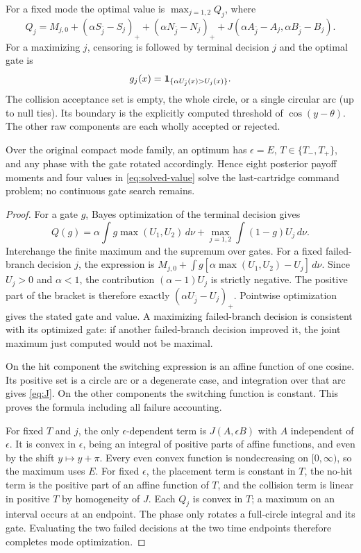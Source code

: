 \begin{theorem}\label{thm:arc}
For a fixed mode the optimal value is $\max_{j=1,2}Q_j$, where
\begin{equation}
 Q_j=M_{j,0}+(\alpha S_{\bar j}-S_j)_+
 +(\alpha N_{\bar j}-N_j)_+
 +J(\alpha A_{\bar j}-A_j,\alpha B_{\bar j}-B_j).
 \label{eq:solved-value}
\end{equation}
For a maximizing $j$, censoring is followed by terminal decision $j$ and the optimal gate is
\begin{equation}
 g_j(x)=\mathbf1_{\{\alpha U_{\bar j}(x)>U_j(x)\}}.
 \label{eq:solved-gate}
\end{equation}
The collision acceptance set is empty, the whole circle, or a single circular arc (up to null ties). Its boundary is the explicitly computed threshold of $\cos(y-\theta)$. The other raw components are each wholly accepted or rejected.

Over the original compact mode family, an optimum has $\epsilon=E$, $T\in\{T_-,T_+\}$, and any phase with the gate rotated accordingly. Hence eight posterior payoff moments and four values in \eqref{eq:solved-value} solve the last-cartridge command problem; no continuous gate search remains.
\end{theorem}
\begin{proof}
For a gate $g$, Bayes optimization of the terminal decision gives
\[
 Q(g)=\alpha\int g\max(U_1,U_2)\,d\nu
       +\max_{j=1,2}\int(1-g)U_j\,d\nu.
\]
Interchange the finite maximum and the supremum over gates. For a fixed failed-branch decision $j$, the expression is
$M_{j,0}+\int g[\alpha\max(U_1,U_2)-U_j]\,d\nu$.
Since $U_j>0$ and $\alpha<1$, the contribution $(\alpha-1)U_j$ is strictly negative. The positive part of the bracket is therefore exactly $(\alpha U_{\bar j}-U_j)_+$. Pointwise optimization gives the stated gate and value. A maximizing failed-branch decision is consistent with its optimized gate: if another failed-branch decision improved it, the joint maximum just computed would not be maximal.

On the hit component the switching expression is an affine function of one cosine. Its positive set is a circle arc or a degenerate case, and integration over that arc gives \eqref{eq:J}. On the other components the switching function is constant. This proves the formula including all failure accounting.

For fixed $T$ and $j$, the only $\epsilon$-dependent term is $J(A,\epsilon B)$ with $A$ independent of $\epsilon$. It is convex in $\epsilon$, being an integral of positive parts of affine functions, and even by the shift $y\mapsto y+\pi$. Every even convex function is nondecreasing on $[0,\infty)$, so the maximum uses $E$. For fixed $\epsilon$, the placement term is constant in $T$, the no-hit term is the positive part of an affine function of $T$, and the collision term is linear in positive $T$ by homogeneity of $J$. Each $Q_j$ is convex in $T$; a maximum on an interval occurs at an endpoint. The phase only rotates a full-circle integral and its gate. Evaluating the two failed decisions at the two time endpoints therefore completes mode optimization.
\end{proof}

